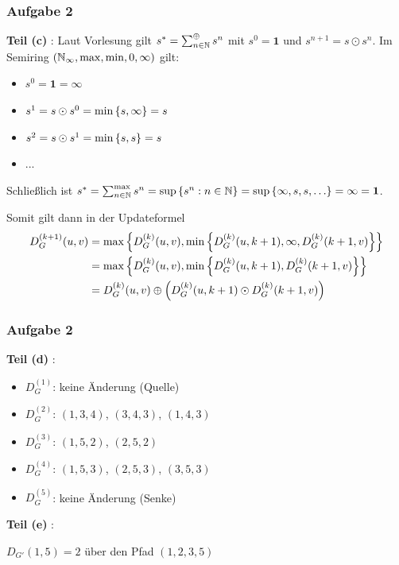 \documentclass{beamer}
\begin{document}
\begin{frame} \frametitle{Aufgabe 2}
	\textbf{Teil (c)} :
	\small
	Laut Vorlesung gilt $s^\ast = \sum_{n \in \mathbb{N}}^{\oplus} s^n$ mit $s^0 = \mathbf{1}$ und $s^{n+1} = s \odot s^n$. Im Semiring $(\mathbb{N}_\infty, \max, \min, 0, \infty)$ gilt:
	\begin{itemize}
		\item $s^0 = \mathbf{1} = \infty$
		\item $s^1 = s \odot s^0 = \min \left\{ s, \infty \right\} = s$
		\item $s^2 = s \odot s^1 = \min \left\{ s, s \right\} = s$
		\item ...
	\end{itemize}
	Schließlich ist $s^\ast = \sum_{n \in \N}^{\max} s^n = \sup \menge{s^n : n \in \N} = \sup \menge{\infty , s, s, \dots} = \infty = \mathbf{1}$.
	
	Somit gilt dann in der Updateformel 
	\begin{equation*}
	\begin{aligned}
		D_G^{(k+1)}(u,v) &= \max \left\{ D_G^{(k)}(u,v) , \min\left\{ D_G^{(k)}(u,k+1) , \infty, D_G^{(k)}(k+1,v) \right\} \right\} \\
		&=	\max \left\{ D_G^{(k)}(u,v) , \min\left\{ D_G^{(k)}(u,k+1), D_G^{(k)}(k+1,v) \right\} \right\} \\
		&= 	D_G^{(k)}(u,v) \oplus \left( D_G^{(k)}(u,k+1) \odot D_G^{(k)}(k+1,v) \right)
	\end{aligned}
	\end{equation*}
\end{frame}
\begin{frame} \frametitle{Aufgabe 2}
	\textbf{Teil (d)} :
	\begin{itemize}
		\item $D_G^{(1)}$: \hspace{.5em} keine Änderung (Quelle)
		\item $D_G^{(2)}$: \hspace{.5em} $(1,3,4)$, $(3,4,3)$, $(1,4,3)$
		\item $D_G^{(3)}$: \hspace{.5em} $(1,5,2)$, $(2,5,2)$
		\item $D_G^{(4)}$: \hspace{.5em} $(1,5,3)$, $(2,5,3)$, $(3,5,3)$
		\item $D_G^{(5)}$: \hspace{.5em} keine Änderung (Senke)
	\end{itemize}
	
	\pause
	
	\textbf{Teil (e)} :
	
	$D_{G'}(1,5) = 2$ über den Pfad $(1,2,3,5)$
\end{frame}
\end{document}

